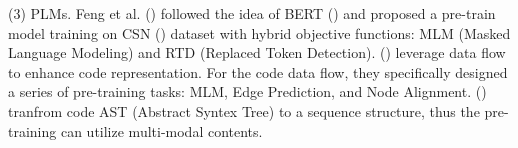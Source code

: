 (3) PLMs. Feng et al. (\citealp{CodeBERT}) followed the idea of BERT (\citealp{BERT}) 
and proposed a pre-train model training on CSN (\citealp{CodeSearchNet}) 
dataset with hybrid objective functions: MLM (Masked Language Modeling) 
and RTD (Replaced Token Detection). (\citealp{GraphCodeBERT}) leverage data flow to 
enhance code representation. 
For the code data flow, they specifically designed a series of pre-training tasks: 
MLM, Edge Prediction, and Node Alignment. (\citealp{UniXcoder}) 
tranfrom code AST (Abstract Syntex Tree) to a sequence structure, 
thus the pre-training can utilize multi-modal contents. 








